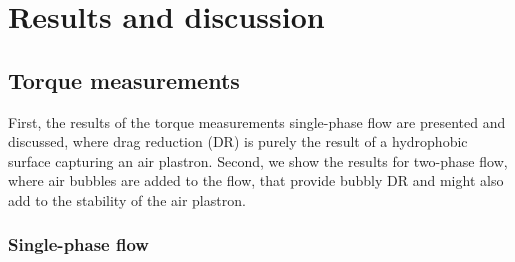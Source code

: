 
 \section{Results and discussion}
\subsection{Torque measurements}
First, the results of the torque measurements single-phase flow are presented and discussed, where drag reduction (DR) is purely the result of a {hydrophobic} surface capturing an air plastron. Second, we show the results for two-phase flow, where air bubbles are added to the flow, that provide bubbly DR and might also add to the stability of the air plastron.
\subsubsection*{Single-phase flow}\noindent
